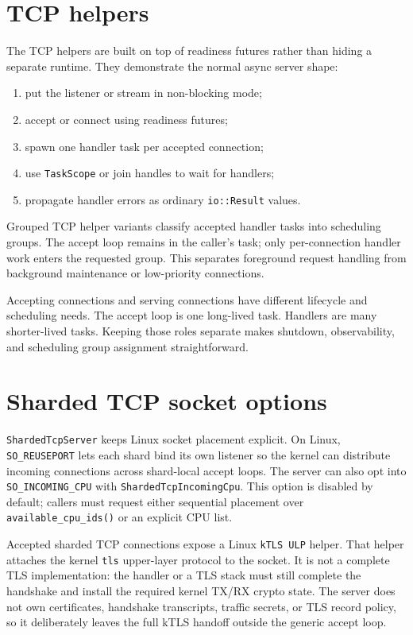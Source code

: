 \section{TCP helpers}

The TCP helpers are built on top of readiness futures rather than hiding a
separate runtime. They demonstrate the normal async server shape:

\begin{enumerate}
    \item put the listener or stream in non-blocking mode;
    \item accept or connect using readiness futures;
    \item spawn one handler task per accepted connection;
    \item use \texttt{TaskScope} or join handles to wait for handlers;
    \item propagate handler errors as ordinary \texttt{io::Result} values.
\end{enumerate}

Grouped TCP helper variants classify accepted handler tasks into scheduling
groups. The accept loop remains in the caller's task; only per-connection
handler work enters the requested group. This separates foreground request
handling from background maintenance or low-priority connections.

Accepting connections and serving connections have different lifecycle and
scheduling needs. The accept loop is one long-lived task. Handlers are many
shorter-lived tasks. Keeping those roles separate makes shutdown,
observability, and scheduling group assignment straightforward.

\section{Sharded TCP socket options}

\texttt{ShardedTcpServer} keeps Linux socket placement explicit. On Linux,
\texttt{SO\_REUSEPORT} lets each shard bind its own listener so the kernel can
distribute incoming connections across shard-local accept loops. The server can
also opt into \texttt{SO\_INCOMING\_CPU} with
\texttt{ShardedTcpIncomingCpu}. This option is disabled by default; callers
must request either sequential placement over \texttt{available\_cpu\_ids()} or
an explicit CPU list.

Accepted sharded TCP connections expose a Linux \texttt{kTLS ULP} helper. That helper
attaches the kernel \texttt{tls} upper-layer protocol to the socket. It is not
a complete TLS implementation: the handler or a TLS stack must still complete
the handshake and install the required kernel TX/RX crypto state. The server
does not own certificates, handshake transcripts, traffic secrets, or TLS
record policy, so it deliberately leaves the full kTLS handoff outside the
generic accept loop.

